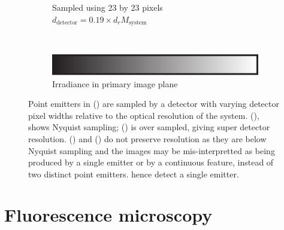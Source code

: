 \begin{figure}
\begin{subfigure}[t]{0.4\textwidth}
        \caption{Sampled using 23 by 23 pixels\\\(d_{\text{detector}} = 0.19 \times d_{r}M_{\text{system}}\)}
        \label{fig:digital_airy_sample_23}
    \end{subfigure}
    \\
    \begin{subfigure}[t]{\textwidth}
      \vspace{\abovecaptionskip}
      \centering
      \includegraphics{./sampling/colourbar}\\
      Irradiance in primary image plane
    \end{subfigure}
    \caption{Point emitters in () are sampled by a detector with varying detector pixel widths relative to the optical resolution of the system.
    (), shows Nyquist sampling;
    () is over sampled, giving super detector resolution.
    () and () do not preserve resolution as they are below Nyquist sampling and the images may be mis-interpretted as being produced by a single emitter or by a continuous feature, instead of two distinct point emitters.
    hence detect a single emitter.}\label{fig:digital_airy}
\end{figure}
\pagebreak

%


\section{Fluorescence microscopy}
